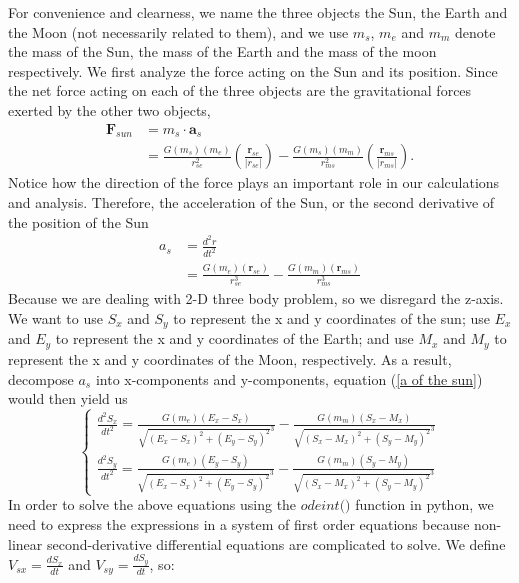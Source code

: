 For convenience and clearness, we name the three objects the Sun, the Earth and the Moon (not necessarily related to them), and we use $m_s$, $m_e$ and $m_m$  denote the mass of the Sun, the mass of the Earth and the mass of the moon respectively. We first analyze the force acting on the Sun and its position. Since the net force acting on each of the three objects are the gravitational forces exerted by the other two objects, 
\begin{align*}
    \mathbf{F}_{sun} 
    & = m_s \cdot \mathbf{a}_s \\
    & = \frac{G \left( m_s \right) \left( m_e \right)}{r_{se}^2} \left( \frac{\mathbf{r}_{se}}{\left| r_{se} \right|} \right) - \frac{G \left( m_s \right) \left( m_m \right)}{r_{ms}^2} \left( \frac{\mathbf{r}_{ms}}{\left| r_{ms} \right|} \right). \tag{71}
\end{align*}
Notice how the direction of the force plays an important role in our calculations and analysis. Therefore, the acceleration of the Sun, or the second derivative of the position of the Sun 
\begin{align*}
    a_s
    & = \frac{d^2 r}{d t^2} \\
    & = \frac{G \left( m_e \right) \left( \mathbf{r}_{se} \right)}{r_{se}^3} - \frac{G \left( m_m \right) \left( \mathbf{r}_{ms} \right)}{r_{ms}^3} \tag{72}
    \label{a of the sun}
\end{align*}
Because we are dealing with 2-D three body problem, so we disregard the z-axis. We want to use $S_x$ and $S_y$ to represent the x and y coordinates of the sun; use $E_x$ and $E_y$ to represent the x and y coordinates of the Earth; and use $M_x$ and $M_y$ to represent the x and y coordinates of the Moon, respectively. As a result, decompose $a_s$ into x-components and y-components, equation (\ref{a of the sun}) would then yield us
\begin{equation}
    \begin{cases}
        \frac{d^2 S_x}{d t^2} = \frac{G (m_e) (E_x - S_x)}{\sqrt{ (E_x - S_x)^2 + (E_y - S_y)^2} ^3} - \frac{G (m_m) (S_x - M_x)}{\sqrt{ (S_x - M_x)^2 + (S_y - M_y)^2} ^3} \\
        \frac{d^2 S_y}{d t^2} = \frac{G (m_e) (E_y - S_y)}{\sqrt{ (E_x - S_x)^2 + (E_y - S_y)^2} ^3} - \frac{G (m_m) (S_y - M_y)}{\sqrt{ (S_x - M_x)^2 + (S_y - M_y)^2} ^3}
    \end{cases}
    \tag{73}
\end{equation}
In order to solve the above equations using the $\textit{odeint()}$ function in python, we need to express the expressions in a system of first order equations because non-linear second-derivative differential equations are complicated to solve. We define $V_{sx} = \frac{d S_x}{dt}$ and $V_{sy} = \frac{d S_y}{dt}$, so:
